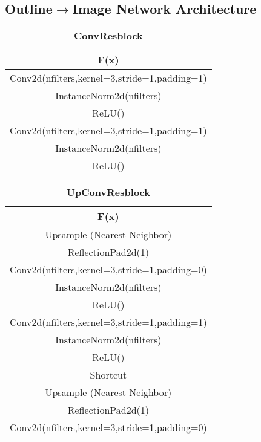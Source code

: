 \subsection{Outline$\rightarrow$Image Network Architecture}

\begin{table}[ht]
\caption{\textbf{ConvResblock}} %
\centering %
\begin{tabular}{c} %
\hline\hline %
F(x)\\%
\hline
Conv2d(nfilters,kernel=3,stride=1,padding=1) \\
InstanceNorm2d(nfilters)\\ %
ReLU() \\
Conv2d(nfilters,kernel=3,stride=1,padding=1) \\
InstanceNorm2d(nfilters)\\ %
ReLU() \\
\hline %
\end{tabular}
\label{table:convresblock} %
\end{table}


\begin{table}[ht]
\caption{\textbf{UpConvResblock}} %
\centering %
\begin{tabular}{c} %
\hline\hline %
F(x)\\%
\hline
Upsample (Nearest Neighbor) \\
ReflectionPad2d(1) \\
Conv2d(nfilters,kernel=3,stride=1,padding=0) \\
InstanceNorm2d(nfilters)\\ %
ReLU() \\
Conv2d(nfilters,kernel=3,stride=1,padding=1) \\
InstanceNorm2d(nfilters)\\ %
ReLU() \\
\hline %
Shortcut\\
\hline 
Upsample (Nearest Neighbor) \\
ReflectionPad2d(1)\\
Conv2d(nfilters,kernel=3,stride=1,padding=0) \\
\hline
\end{tabular}
\label{table:upconvresblock} %
\end{table}

